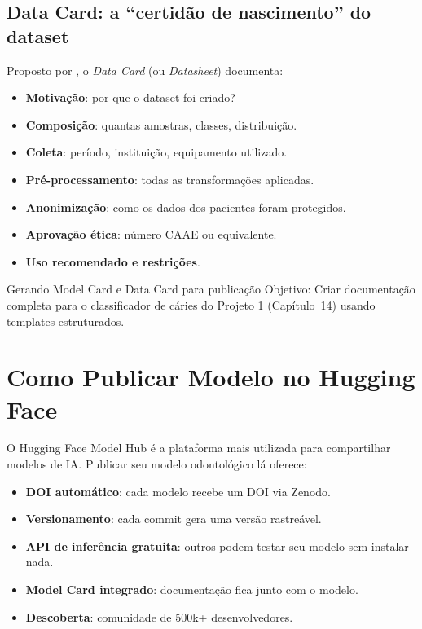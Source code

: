 \subsection{Data Card: a ``certidão de nascimento'' do dataset}

Proposto por , o \textit{Data Card}
(ou \textit{Datasheet}) documenta:

\begin{itemize}
  \item \textbf{Motivação}: por que o dataset foi criado?
  \item \textbf{Composição}: quantas amostras, classes, distribuição.
  \item \textbf{Coleta}: período, instituição, equipamento utilizado.
  \item \textbf{Pré-processamento}: todas as transformações aplicadas.
  \item \textbf{Anonimização}: como os dados dos pacientes foram protegidos.
  \item \textbf{Aprovação ética}: número CAAE ou equivalente.
  \item \textbf{Uso recomendado e restrições}.
\end{itemize}

\begin{pratica}{Gerando Model Card e Data Card para publicação}
  Objetivo: Criar documentação completa para o classificador de cáries
  do Projeto 1 (Capítulo~14) usando templates estruturados.
\end{pratica}



\section{Como Publicar Modelo no Hugging Face}

O Hugging Face Model Hub é a plataforma mais utilizada para compartilhar
modelos de IA. Publicar seu modelo odontológico lá oferece:

\begin{itemize}
  \item \textbf{DOI automático}: cada modelo recebe um DOI via Zenodo.
  \item \textbf{Versionamento}: cada commit gera uma versão rastreável.
  \item \textbf{API de inferência gratuita}: outros podem testar seu
    modelo sem instalar nada.
  \item \textbf{Model Card integrado}: documentação fica junto com o modelo.
  \item \textbf{Descoberta}: comunidade de 500k+ desenvolvedores.
\end{itemize}


